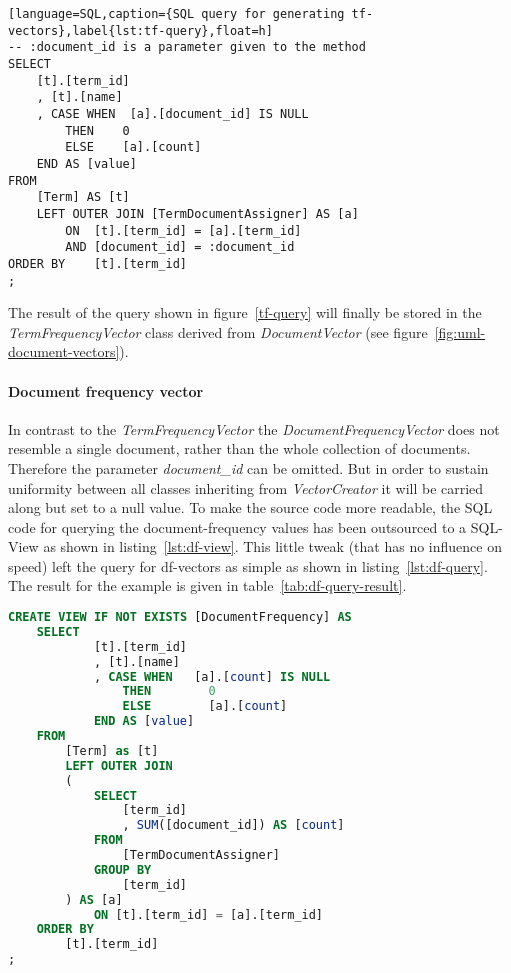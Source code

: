 \begin{lstlisting}[language=SQL,caption={SQL query for generating tf-vectors},label{lst:tf-query},float=h]
-- :document_id is a parameter given to the method
SELECT
    [t].[term_id]
    , [t].[name]
    , CASE WHEN  [a].[document_id] IS NULL
        THEN    0
        ELSE    [a].[count]
    END AS [value]
FROM
    [Term] AS [t]
    LEFT OUTER JOIN [TermDocumentAssigner] AS [a]
        ON  [t].[term_id] = [a].[term_id]
        AND [document_id] = :document_id
ORDER BY    [t].[term_id]
;
\end{lstlisting}

\noindent
The result of the query shown in figure~\ref{tf-query} will finally be stored in the \textit{TermFrequencyVector} class derived from \textit{DocumentVector} (see figure~\ref{fig:uml-document-vectors}).

\paragraph{Document frequency vector}
In contrast to the \textit{TermFrequencyVector} the \textit{DocumentFrequencyVector} does not resemble a single document, rather than the whole collection of documents.
Therefore the parameter \textit{document\_id} can be omitted.
But in order to sustain uniformity between all classes inheriting from \textit{VectorCreator} it will be carried along but set to a null value.
To make the source code more readable, the SQL code for querying the document-frequency values has been outsourced to a SQL-View as shown in listing~\ref{lst:df-view}.
This little tweak (that has no influence on speed) left the query for df-vectors as simple as shown in listing~\ref{lst:df-query}.
The result for the example is given in table~\ref{tab:df-query-result}.

\begin{lstlisting}[language=SQL,caption={SQL statement to create the \textit{DocumentFrequency}-view},label={lst:df-view},float=h]
CREATE VIEW IF NOT EXISTS [DocumentFrequency] AS
    SELECT
            [t].[term_id]
            , [t].[name]
            , CASE WHEN   [a].[count] IS NULL
                THEN        0
                ELSE        [a].[count]
            END AS [value]
    FROM
        [Term] as [t]
        LEFT OUTER JOIN
        (
            SELECT
                [term_id]
                , SUM([document_id]) AS [count]
            FROM
                [TermDocumentAssigner]
            GROUP BY
                [term_id]
        ) AS [a]
            ON [t].[term_id] = [a].[term_id]
    ORDER BY
        [t].[term_id]
;
\end{lstlisting}

